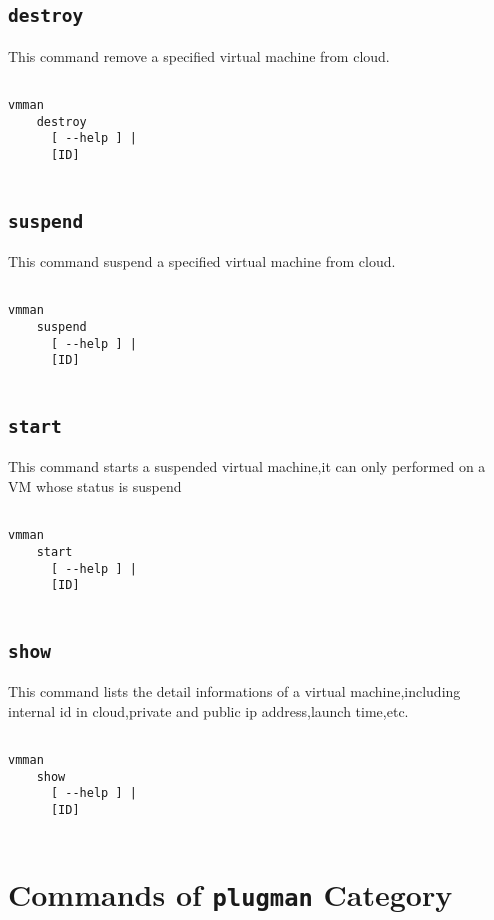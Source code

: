 \documentclass[11pt]{article}
\def \ttt{\texttt}
\begin{document}
\subsection{\ttt{destroy}}
This command remove a specified virtual machine from cloud.
\begin{Verbatim}[fontfamily=courier, fontsize = \small, obeytabs
=true, tabsize=4, frame=lines]

vmman 
    destroy 
      [ --help ] |
	  [ID] 
      
\end{Verbatim}


\subsection{\ttt{suspend}}
This command suspend a specified virtual machine from cloud.
\begin{Verbatim}[fontfamily=courier, fontsize = \small, obeytabs
=true, tabsize=4, frame=lines]

vmman 
    suspend 
      [ --help ] |
	  [ID] 
      
\end{Verbatim}
\newpage
\subsection{\ttt{start}}
This command starts a suspended virtual machine,it can only performed on a VM whose status
is suspend


\begin{Verbatim}[fontfamily=courier, fontsize = \small, obeytabs
=true, tabsize=4, frame=lines]

vmman 
    start 
      [ --help ] |
	  [ID] 
      
\end{Verbatim}

\subsection{\ttt{show}}
This command lists the detail informations of a virtual machine,including internal id in cloud,private and public ip address,launch time,etc.
\begin{Verbatim}[fontfamily=courier, fontsize = \small, obeytabs
=true, tabsize=4, frame=lines]

vmman 
    show 
      [ --help ] |
	  [ID] 
      
\end{Verbatim}

\section{Commands of \ttt{plugman} Category}
\end{document}
